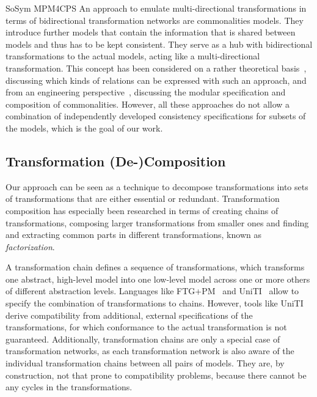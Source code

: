 \begin{copiedFrom}{SoSym MPM4CPS}
An approach to emulate multi-directional transformations in terms of bidirectional transformation networks are commonalities models. 
They introduce further models that contain the information that is shared between models and thus has to be kept consistent.
They serve as a hub with bidirectional transformations to the actual models, acting like a multi-directional transformation.
This concept has been considered on a rather theoretical basis~\cite{stunkel2018MultimodelCorrespondence-ICPS, diskin2018MultiModelSynchronization-FASE}, discussing which kinds of relations can be expressed with such an approach, and from an engineering perspective~\cite{klare2019models}, discussing the modular specification and composition of commonalities.
However, all these approaches do not allow a combination of independently developed consistency specifications for subsets of the models, which is the goal of our work.


\subsection{Transformation (De-)Composition}
Our approach can be seen as a technique to decompose transformations into sets of transformations that are either essential or redundant.
Transformation composition has especially been researched in terms of creating chains of transformations, composing larger transformations from smaller ones and finding and extracting common parts in different transformations, known as \emph{factorization}.

A transformation chain defines a sequence of transformations, which transforms one abstract, high-level model into one low-level model across one or more others of different abstraction levels.
Languages like FTG+PM~\cite{lucio2013FTGPM-SDL} and UniTI~\cite{%
vanhooff2007UniTI-MODELS}
allow to specify the combination of transformations to chains.
However, tools like UniTI derive compatibility from additional, external specifications of the transformations, for which conformance to the actual transformation is not guaranteed.
Additionally, transformation chains are only a special case of transformation networks, as each transformation network is also aware of the individual transformation chains between all pairs of models.
They are, by construction, not that prone to compatibility problems, because there cannot be any cycles in the transformations.


\end{copiedFrom}
